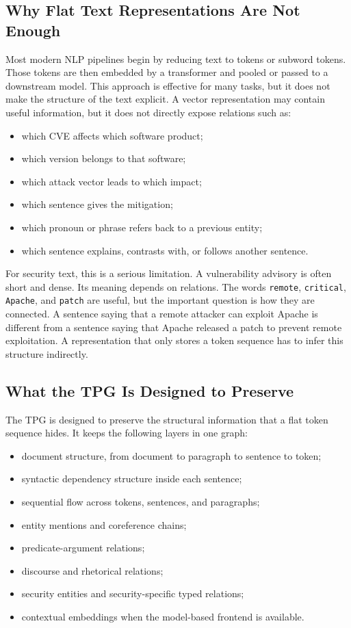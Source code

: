\documentclass[11pt]{article}
\begin{document}
\subsection{Why Flat Text Representations Are Not Enough}

Most modern NLP pipelines begin by reducing text to tokens or subword tokens.
Those tokens are then embedded by a transformer and pooled or passed to a
downstream model. This approach is effective for many tasks, but it does not
make the structure of the text explicit. A vector representation may contain
useful information, but it does not directly expose relations such as:

\begin{itemize}
    \item which CVE affects which software product;
    \item which version belongs to that software;
    \item which attack vector leads to which impact;
    \item which sentence gives the mitigation;
    \item which pronoun or phrase refers back to a previous entity;
    \item which sentence explains, contrasts with, or follows another sentence.
\end{itemize}

For security text, this is a serious limitation. A vulnerability advisory is
often short and dense. Its meaning depends on relations. The words
\texttt{remote}, \texttt{critical}, \texttt{Apache}, and \texttt{patch} are
useful, but the important question is how they are connected. A sentence saying
that a remote attacker can exploit Apache is different from a sentence saying
that Apache released a patch to prevent remote exploitation. A representation
that only stores a token sequence has to infer this structure indirectly.

\subsection{What the TPG Is Designed to Preserve}

The TPG is designed to preserve the structural information that a flat token
sequence hides. It keeps the following layers in one graph:

\begin{itemize}
    \item document structure, from document to paragraph to sentence to token;
    \item syntactic dependency structure inside each sentence;
    \item sequential flow across tokens, sentences, and paragraphs;
    \item entity mentions and coreference chains;
    \item predicate-argument relations;
    \item discourse and rhetorical relations;
    \item security entities and security-specific typed relations;
    \item contextual embeddings when the model-based frontend is available.
\end{itemize}
\end{document}
